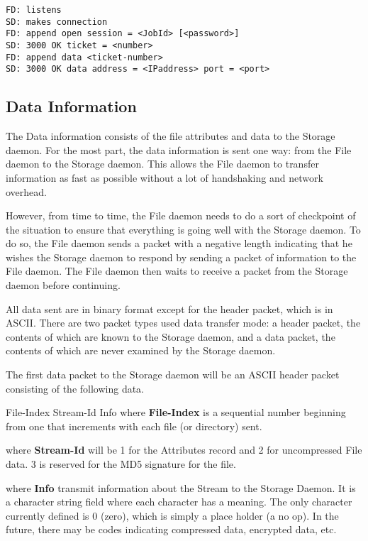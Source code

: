 \footnotesize
\begin{verbatim}
FD: listens
SD: makes connection
FD: append open session = <JobId> [<password>]
SD: 3000 OK ticket = <number>
FD: append data <ticket-number>
SD: 3000 OK data address = <IPaddress> port = <port>
\end{verbatim}
\normalsize

\subsection{Data Information}

The Data information consists of the file attributes and data to the Storage
daemon. For the most part, the data information is sent one way: from the File
daemon to the Storage daemon. This allows the File daemon to transfer
information as fast as possible without a lot of handshaking and network
overhead. 

However, from time to time, the File daemon needs to do a sort of checkpoint
of the situation to ensure that everything is going well with the Storage
daemon. To do so, the File daemon sends a packet with a negative length
indicating that he wishes the Storage daemon to respond by sending a packet of
information to the File daemon. The File daemon then waits to receive a packet
from the Storage daemon before continuing. 

All data sent are in binary format except for the header packet, which is in
ASCII. There are two packet types used data transfer mode: a header packet,
the contents of which are known to the Storage daemon, and a data packet, the
contents of which are never examined by the Storage daemon. 

The first data packet to the Storage daemon will be an ASCII header packet
consisting of the following data. 

\lt{}File-Index\gt{} \lt{}Stream-Id\gt{} \lt{}Info\gt{} where {\bf
\lt{}File-Index\gt{}} is a sequential number beginning from one that
increments with each file (or directory) sent. 

where {\bf \lt{}Stream-Id\gt{}} will be 1 for the Attributes record and 2 for
uncompressed File data. 3 is reserved for the MD5 signature for the file. 

where {\bf \lt{}Info\gt{}} transmit information about the Stream to the
Storage Daemon. It is a character string field where each character has a
meaning. The only character currently defined is 0 (zero), which is simply a
place holder (a no op). In the future, there may be codes indicating
compressed data, encrypted data, etc. 

